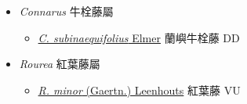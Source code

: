 
  \begin{itemize}
 \item[] \textit{Connarus} 牛栓藤屬
                                
  \begin{itemize}
        \item[] \href{http://www.theplantlist.org/tpl1.1/search?q=Connarus+subinaequifolius}{\textit{C. subinaequifolius} Elmer}   蘭嶼牛栓藤   DD
  \end{itemize}
 \item[] \textit{Rourea} 紅葉藤屬
                                
  \begin{itemize}
        \item[] \href{http://www.theplantlist.org/tpl1.1/search?q=Rourea+minor}{\textit{R. minor} (Gaertn.) Leenhouts}   紅葉藤   VU
  \end{itemize}
  \end{itemize}
